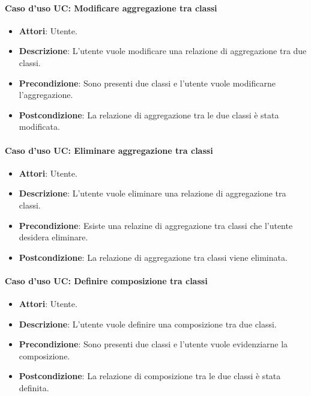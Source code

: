 \paragraph{Caso d'uso UC: Modificare aggregazione tra classi}
\begin{itemize}
	\item\textbf{Attori}: Utente.
	\item\textbf{Descrizione}: L'utente vuole modificare una relazione di aggregazione tra due classi.
	\item\textbf{Precondizione}: Sono presenti due classi e l'utente vuole modificarne l'aggregazione.
	\item\textbf{Postcondizione}: La relazione di aggregazione tra le due classi è stata modificata.
\end{itemize}

\paragraph{Caso d'uso UC: Eliminare aggregazione tra classi}
\begin{itemize}
	\item\textbf{Attori}: Utente.
	\item\textbf{Descrizione}: L'utente vuole eliminare una relazione di aggregazione tra classi.
	\item\textbf{Precondizione}: Esiste una relazine di aggregazione tra classi che l'utente desidera eliminare.
	\item\textbf{Postcondizione}: La relazione di aggregazione tra classi viene eliminata.
\end{itemize}

\paragraph{Caso d'uso UC: Definire composizione tra classi}
\begin{itemize}
	\item\textbf{Attori}: Utente.
	\item\textbf{Descrizione}: L'utente vuole definire una composizione tra due classi.
	\item\textbf{Precondizione}: Sono presenti due classi e l'utente vuole evidenziarne la composizione.
	\item\textbf{Postcondizione}: La relazione di composizione tra le due classi è stata definita.
\end{itemize}

